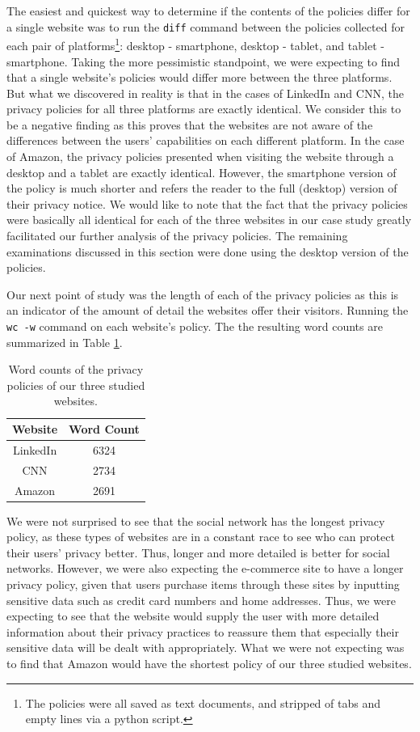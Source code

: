 \documentclass{acm_proc_article-sp}
\begin{document}
The easiest and quickest way to determine if the contents of the policies differ for a single website was to run the \texttt{diff} command between the policies collected for each pair of platforms\footnote{The policies were all saved as text documents, and stripped of tabs and empty lines via a python script.}: desktop - smartphone, desktop - tablet, and tablet - smartphone. Taking the more pessimistic standpoint, we were expecting to find that a single website's policies would differ more between the three platforms. But what we discovered in reality is that in the cases of LinkedIn and CNN, the privacy policies for all three platforms are exactly identical. We consider this to be a negative finding as this proves that the websites are not aware of the differences between the users' capabilities on each different platform. In the case of Amazon, the privacy policies presented when visiting the website through a desktop and a tablet are exactly identical. However, the smartphone version of the policy is much shorter and refers the reader to the full (desktop) version of their privacy notice. We would like to note that the fact that the privacy policies were basically all identical for each of the three websites in our case study greatly facilitated our further analysis of the privacy policies. The remaining examinations discussed in this section were done using the desktop version of the policies.

Our next point of study was the length of each of the privacy policies as this is an indicator of the amount of detail the websites offer their visitors. Running the \texttt{wc -w} command on each website's policy. The the resulting word counts are summarized in Table \ref{tab:wc}.

\begin{table}[htbp]
  \centering
  \caption{Word counts of the privacy policies of our three studied websites.}
    \begin{tabular}{|c|c|}
    \hline
    \textbf{Website} & \textbf{Word Count} \\    
     \hline
     LinkedIn & 6324 \\
     CNN & 2734 \\
     Amazon & 2691 \\
     \hline
    \end{tabular}%
  \label{tab:wc}%
\end{table}%

We were not surprised to see that the social network has the longest privacy policy, as these types of websites are in a constant race to see who can protect their users' privacy better. Thus, longer and more detailed is better for social networks. However, we were also expecting the e-commerce site to have a longer privacy policy, given that users purchase items through these sites by inputting sensitive data such as credit card numbers and home addresses. Thus, we were expecting to see that the website would supply the user with more detailed information about their privacy practices to reassure them that especially their sensitive data will be dealt with appropriately. What we were not expecting was to find that Amazon would have the shortest policy of our three studied websites.
\end{document}
